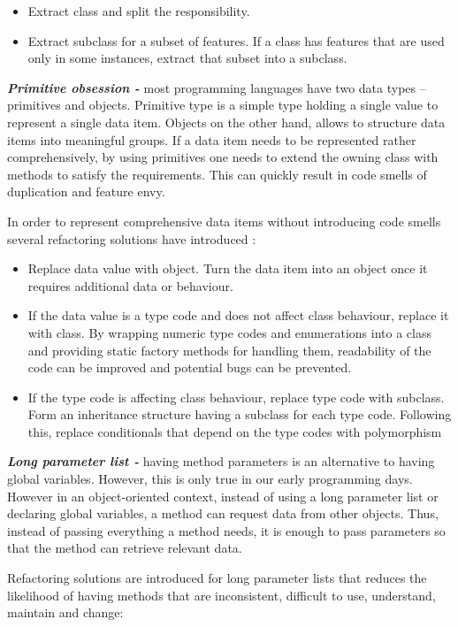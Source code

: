 \begin{itemize}
\item Extract class and split the responsibility. 
\item Extract subclass for a subset of features. If a class has features that are used only in some instances, extract that subset into a subclass.
\end{itemize}

\textit{\textbf{Primitive obsession -}} most programming languages have two data types -- primitives and objects. Primitive type is a simple type holding a single value to represent a single data item. Objects on the other hand, allows to structure data items into meaningful groups. If a data item needs to be represented rather comprehensively, by using primitives one needs to extend the owning class with methods to satisfy the requirements. This can quickly result in code smells of duplication and feature envy.

In order to represent comprehensive data items without introducing code smells several refactoring solutions have introduced \cite{fowlerRefactor}:

\begin{itemize}
\item Replace data value with object. Turn the data item into an object once it requires additional data or behaviour.
\item If the data value is a type code and does not affect class behaviour, replace it with class. By wrapping numeric type codes and enumerations into a class and providing static factory methods for handling them, readability of the code can be improved and potential bugs can be prevented.  
\item If the type code is affecting class behaviour, replace type code with subclass. Form an inheritance structure having a subclass for each type code. Following this, replace conditionals that depend on the type codes with polymorphism
\end{itemize}

\textit{\textbf{Long parameter list -}} having method parameters is an alternative to having global variables. However, this is only true in our early programming days. However in an object-oriented context, instead of using a long parameter list or declaring global variables, a method can request data from other objects. Thus, instead of passing everything a method needs, it is enough to pass parameters so that the method can retrieve relevant data. 

Refactoring solutions are introduced for long parameter lists \cite{fowlerRefactor} that reduces the likelihood of having methods that are inconsistent, difficult to use, understand, maintain and change:


